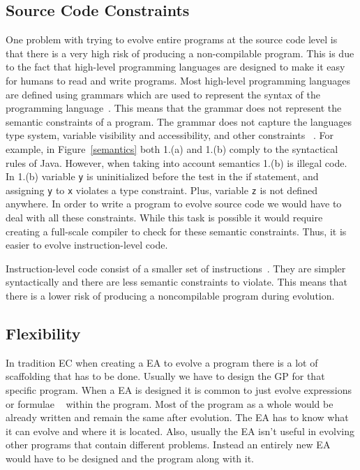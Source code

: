 \documentclass{sig-alternate}
\begin{document}
\subsection{Source Code Constraints}
One problem with trying to evolve entire programs at the source code level is that there is a very high risk of producing a non-compilable program. This is due to the fact that high-level programming languages are designed to make it easy for humans to read and write programs. Most high-level programming languages are defined using grammars which are used to represent the syntax of the programming language~\cite{Oracle:2013,Assembly:2010}. This means that the grammar does not represent the semantic constraints of a program. The grammar does not capture the languages type system, variable visibility and accessibility, and other constraints ~\cite{FINCH:2011}. For example, in Figure~\ref{semantics} both 1.(a) and 1.(b) comply to the syntactical rules of Java. However, when taking into account semantics 1.(b) is illegal code. In 1.(b) variable \texttt{y} is uninitialized before the test in the if statement, and assigning \texttt{y} to \texttt{x} violates a type constraint. Plus, variable \texttt{z} is not defined anywhere.  In order to write a program to evolve source code we would have to deal with all these constraints. While this task is possible it would require creating a full-scale compiler to check for these semantic constraints. Thus, it is easier to evolve instruction-level code. \par

Instruction-level code consist of a smaller set of instructions~\cite{Assembly:2010}. They are simpler syntactically and there are less semantic constraints to violate. This means that there is a lower risk of producing a noncompilable program during evolution. 

\subsection{Flexibility}
In tradition EC when creating a EA to evolve a program there is a lot of scaffolding that has to be done. Usually we have to design the GP for that specific program. When a EA is designed it is common to just evolve expressions or formulae ~\cite{FINCH:2011} within the program. Most of the program as a whole would be already written and remain the same after evolution. The EA has to know what it can evolve and where it is located. Also, usually the EA isn't useful in evolving other programs that contain different problems. Instead an entirely new EA would have to be designed and the program along with it.
\end{document}

